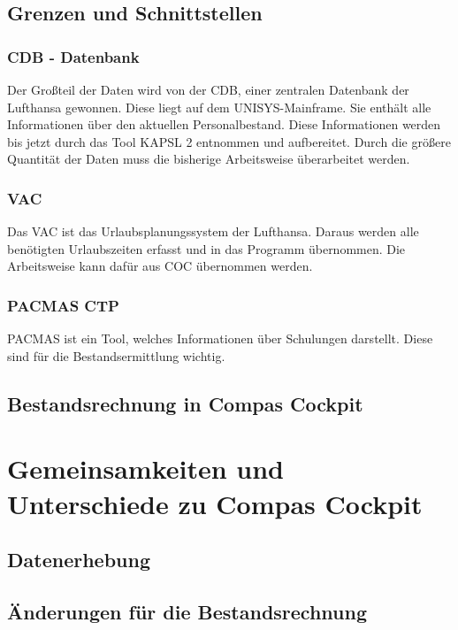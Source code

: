 \documentclass [12pt, a4paper, oneside, titlepage, ngerman]{article}
\begin{document}
\subsection{Grenzen und Schnittstellen}
\subsubsection{CDB - Datenbank}
Der Großteil der Daten wird von der CDB, einer zentralen Datenbank der Lufthansa gewonnen. Diese liegt auf dem UNISYS-Mainframe. Sie enthält alle Informationen über den aktuellen Personalbestand. Diese Informationen werden bis jetzt durch das Tool KAPSL 2 entnommen und aufbereitet. Durch die größere Quantität der Daten muss die bisherige Arbeitsweise überarbeitet werden. 

\subsubsection{VAC} 
Das VAC ist das Urlaubsplanungssystem der Lufthansa. Daraus werden alle benötigten Urlaubszeiten erfasst und in das Programm übernommen. Die Arbeitsweise kann dafür aus \ac{COC} übernommen werden.

\subsubsection{PACMAS CTP}
PACMAS ist ein Tool, welches Informationen über Schulungen darstellt. Diese sind für die Bestandsermittlung wichtig.

\subsection{Bestandsrechnung in Compas Cockpit}

\section{Gemeinsamkeiten und Unterschiede zu Compas Cockpit}
\subsection{Datenerhebung}
\subsection{Änderungen für die Bestandsrechnung}

\newpage
\end{document}

